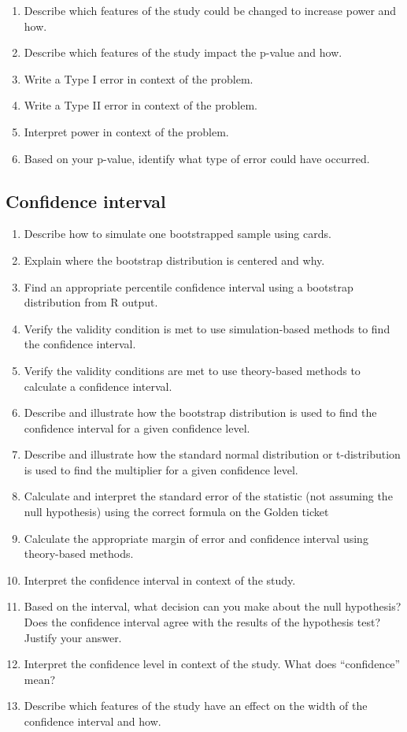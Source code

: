 \documentclass[
]{report}
\begin{document}
\begin{enumerate}
\item
  Describe which features of the study could be changed to increase power and how.
\item
  Describe which features of the study impact the p-value and how.
\item
  Write a Type I error in context of the problem.
\item
  Write a Type II error in context of the problem.
\item
  Interpret power in context of the problem.
\item
  Based on your p-value, identify what type of error could have occurred.
\end{enumerate}

\subsection*{Confidence interval}\label{confidence-interval-3}

\begin{enumerate}
\def\labelenumi{\arabic{enumi}.}
\setcounter{enumi}{30}
\item
  Describe how to simulate one bootstrapped sample using cards.
\item
  Explain where the bootstrap distribution is centered and why.
\item
  Find an appropriate percentile confidence interval using a bootstrap distribution from R output.
\item
  Verify the validity condition is met to use simulation-based methods to find the confidence interval.
\item
  Verify the validity conditions are met to use theory-based methods to calculate a confidence interval.
\item
  Describe and illustrate how the bootstrap distribution is used to find the confidence interval for a given confidence level.
\item
  Describe and illustrate how the standard normal distribution or t-distribution is used to find the multiplier for a given confidence level.
\item
  Calculate and interpret the standard error of the statistic (not assuming the null hypothesis) using the correct formula on the Golden ticket
\item
  Calculate the appropriate margin of error and confidence interval using theory-based methods.
\item
  Interpret the confidence interval in context of the study.
\item
  Based on the interval, what decision can you make about the null hypothesis? Does the confidence interval agree with the results of the hypothesis test? Justify your answer.
\item
  Interpret the confidence level in context of the study. What does ``confidence'' mean?
\item
  Describe which features of the study have an effect on the width of the confidence interval and how.
\end{enumerate}
\end{document}
